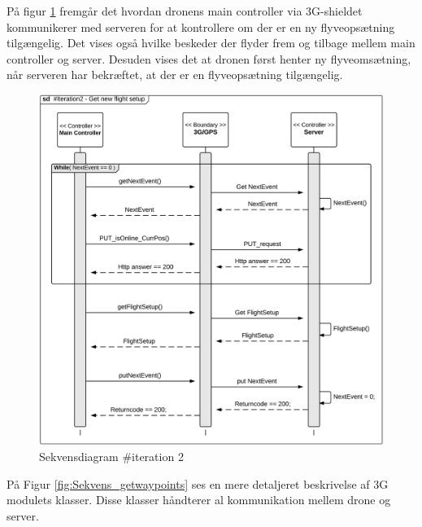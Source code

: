 \newpage

På figur \ref{fig:Sekvens_diagram_iteration2_2} fremgår det hvordan dronens main controller via 3G-shieldet kommunikerer med serveren for at kontrollere om der er en ny flyveopsætning tilgængelig. Det vises også hvilke beskeder der flyder frem og tilbage mellem main controller og server. Desuden vises det at dronen først henter ny flyveomsætning, når serveren har bekræftet, at der er en flyveopsætning tilgængelig.   

\begin{figure}[H]
	\centering
	\includegraphics[width=1\textwidth]{Billeder/sekvens/sekvens_iteration2_2}
	\caption{Sekvensdiagram \#iteration 2}
	\label{fig:Sekvens_diagram_iteration2_2}
\end{figure}

\newpage

På Figur \ref{fig:Sekvens_getwaypoints} ses en mere detaljeret beskrivelse af 3G modulets klasser. Disse klasser håndterer al kommunikation mellem drone og server.

